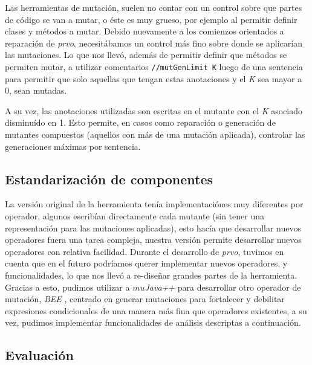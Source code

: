 Las herramientas de mutaci\'on, suelen no contar con un control sobre que partes de c\'odigo se van a mutar, o \'este es muy grueso, por ejemplo al permitir definir clases y m\'etodos a mutar. Debido nuevamente a los comienzos orientados a reparaci\'on de \emph{prvo}, necesit\'abamos un control m\'as fino sobre donde se aplicar\'ian las mutaciones. Lo que nos llev\'o, adem\'as de permitir definir que m\'etodos se permiten mutar, a utilizar comentarios \lstinline|//mutGenLimit K| luego de una sentencia para permitir que solo aquellas que tengan estas anotaciones y el \emph{K} sea mayor a 0, sean mutadas.

A su vez, las anotaciones utilizadas son escritas en el mutante con el \emph{K} asociado disminu\'ido en 1. Esto permite, en casos como reparaci\'on o generaci\'on de mutantes compuestos (aquellos con m\'as de una mutaci\'on aplicada), controlar las generaciones m\'aximas por sentencia.

\subsection{Estandarizaci\'on de componentes}

La versi\'on original de la herramienta ten\'ia implementaci\'ones muy diferentes por operador, algunos escrib\'ian directamente cada mutante (sin tener una representaci\'on para las mutaciones aplicadas), esto hac\'ia que desarrollar nuevos operadores fuera una tarea compleja, nuestra versi\'on permite desarrollar nuevos operadores con relativa facilidad. Durante el desarrollo de \emph{prvo}, tuvimos en cuenta que en el futuro podr\'iamos querer implementar nuevos operadores, y funcionalidades, lo que nos llev\'o a re-dise\~nar grandes partes de la herramienta. Gracias a esto, pudimos utilizar a \emph{$mu$Java++} para desarrollar otro operador de mutaci\'on, \emph{BEE} \cite{bibliography.mutation.operators.beeBridaS17}, centrado en generar mutaciones para fortalecer y debilitar expresiones condicionales de una manera m\'as fina que operadores existentes, a su vez, pudimos implementar funcionalidades de an\'alisis descriptas a continuaci\'on.

\subsection{Evaluaci\'on}

